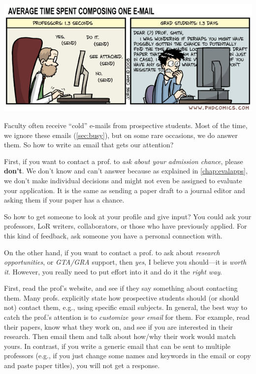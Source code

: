 \documentclass[oneside,11pt,dvipsnames]{book}
\begin{document}
\begin{center}
  \includegraphics[scale=0.5]{files/emails.png}
\end{center}


Faculty often receive ``cold'' e-mails from prospective students. Most of the time, we ignore these emails (\autoref{sec:busy}), but on some rare occasions, we do answer them. So how to write an email that gets our attention?

First, if you want to contact a prof. to \emph{ask about your admission chance}, please \textbf{don't}. We don't know and can't answer because as explained in \autoref{chap:evalapps}, we don't make individual decisions and might not even be assigned to evaluate your application.  It is the same as sending a paper draft to a journal editor and asking them if your paper has a chance.

So how to get someone to look at your profile and give input? You could ask your professors, LoR writers, collaborators, or those who have previously applied. For this kind of feedback, ask someone you have a personal connection with.

On the other hand, if you want to contact a prof. to ask about \emph{research opportunities}, or \emph{GTA/GRA} support, then \emph{yes}, I believe you should---it is \emph{worth it}. However, you really need to put effort into it and do it the \emph{right way}.

First, read the prof's website, and see if they say something about contacting them. Many profs. explicitly state how prospective students should (or should not) contact them, e.g., using specific email subjects.
In general, the best way to catch the prof.'s attention is to \emph{customize your email} for them.  For example, read their papers, know what they work on, and see if you are interested in their research. Then email them and talk about how/why their work would match yours.
In contrast, if you write a generic email that can be sent to multiple professors (e.g., if you just change some names and keywords in the email or copy and paste paper titles), you will not get a response.
\end{document}
